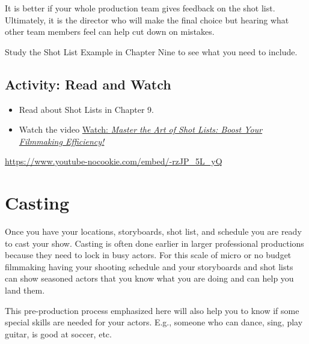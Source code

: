 \documentclass[
  letterpaper,
  DIV=11,
  numbers=noendperiod]{scrreprt}
\providecommand{\tightlist}{%
  \setlength{\itemsep}{0pt}\setlength{\parskip}{0pt}}\usepackage{longtable,booktabs,array}
\begin{document}
It is better if your whole production team gives feedback on the shot
list. Ultimately, it is the director who will make the final choice but
hearing what other team members feel can help cut down on mistakes.

Study the Shot List Example in Chapter Nine to see what you need to
include.

\subsection{Activity: Read and Watch}\label{activity-read-and-watch-2}

\begin{tcolorbox}[enhanced jigsaw, titlerule=0mm, leftrule=.75mm, bottomrule=.15mm, colback=white, left=2mm, opacitybacktitle=0.6, title={Learning Activity}, colbacktitle=quarto-callout-note-color!10!white, colframe=quarto-callout-note-color-frame, bottomtitle=1mm, toptitle=1mm, opacityback=0, rightrule=.15mm, breakable, arc=.35mm, toprule=.15mm, coltitle=black]

\begin{itemize}
\tightlist
\item
  Read about Shot Lists in Chapter 9.
\item
  Watch the video
  \href{https://www.youtube.com/watch?v=-rzJP_5L_yQ}{Watch: \emph{Master
  the Art of Shot Lists: Boost Your Filmmaking Efficiency!}}
\end{itemize}

\url{https://www.youtube-nocookie.com/embed/-rzJP_5L_yQ}

\end{tcolorbox}

\section{Casting}\label{casting}

Once you have your locations, storyboards, shot list, and schedule you
are ready to cast your show. Casting is often done earlier in larger
professional productions because they need to lock in busy actors. For
this scale of micro or no budget filmmaking having your shooting
schedule and your storyboards and shot lists can show seasoned actors
that you know what you are doing and can help you land them.

This pre-production process emphasized here will also help you to know
if some special skills are needed for your actors. E.g., someone who can
dance, sing, play guitar, is good at soccer, etc.
\end{document}
